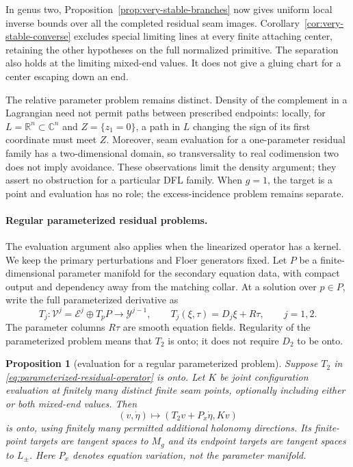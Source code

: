 \documentclass[11pt]{amsart}
\newtheorem{proposition}[theorem]{Proposition}
\theoremstyle{definition}
\theoremstyle{remark}
\theoremstyle{plain}
\newcommand{\RR}{\mathbb{R}}
\newcommand{\CC}{\mathbb{C}}
\begin{document}
In genus two, Proposition~\ref{prop:very-stable-branches}
now gives uniform local inverse bounds over all the completed
residual seam images. Corollary~\ref{cor:very-stable-converse}
excludes special limiting lines at every finite attaching center,
retaining the other hypotheses on the full normalized primitive.
The separation also holds at the limiting mixed-end values.
It does not give a gluing chart for a center escaping down an end.

The relative parameter problem remains distinct. Density of the
complement in a Lagrangian need not permit paths between prescribed
endpoints: locally, for $L=\RR^n\subset\CC^n$ and
$Z=\{z_1=0\}$, a path in $L$ changing the sign of its first
coordinate must meet $Z$. Moreover, seam evaluation for a
one-parameter residual family has a two-dimensional domain,
so transversality to real codimension two does not imply
avoidance. These observations limit the density argument;
they assert no obstruction for a particular DFL family.
When $g=1$, the target is a point and evaluation has no role;
the excess-incidence problem remains separate.

\paragraph{Regular parameterized residual problems.}
The evaluation argument also applies when the linearized operator
has a kernel. We keep the primary perturbations and Floer
generators fixed. Let $P$ be a finite-dimensional parameter
manifold for the secondary equation data, with compact output
and dependency away from the matching collar. At a solution over
$p\in P$, write the full parameterized derivative as
\begin{equation}\label{eq:parameterized-residual-operator}
 T_j:\mathcal V^j=\mathcal E^j\oplus T_pP\longrightarrow
       \mathcal Y^{j-1},\qquad
 T_j(\xi,\tau)=D_j\xi+R\tau,\qquad j=1,2.
\end{equation}
The parameter columns $R\tau$ are smooth equation fields.
Regularity of the parameterized problem means that $T_2$ is onto;
it does not require $D_2$ to be onto.

\begin{proposition}[evaluation for a regular parameterized problem]
\label{prop:parameterized-residual-evaluation}
Suppose $T_2$ in \eqref{eq:parameterized-residual-operator}
is onto. Let $K$ be joint configuration evaluation at finitely
many distinct finite seam points, optionally including either
or both mixed-end values. Then
\begin{equation}\label{eq:parameterized-augmented-evaluation}
 (v,\dot\eta)\longmapsto(T_2v+P_x\dot\eta,Kv)
\end{equation}
is onto, using finitely many permitted additional holonomy
directions. Its finite-point targets are tangent spaces to
$M_g$ and its endpoint targets are tangent spaces to $L_\pm$.
Here $P_x$ denotes equation variation, not the parameter manifold.
\end{proposition}
\end{document}
